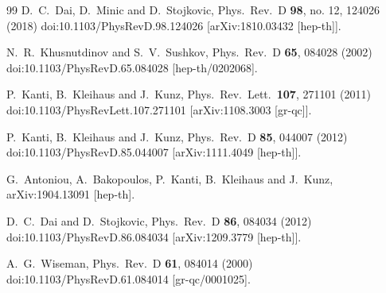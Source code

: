 \documentclass[prd, amsfonts, twocolumn, nofootinbib, showpacs]{revtex4}
\begin{document}
\begin{thebibliography}{99}
  D.~C.~Dai, D.~Minic and D.~Stojkovic,
  Phys.\ Rev.\ D {\bf 98}, no. 12, 124026 (2018)
  doi:10.1103/PhysRevD.98.124026
  [arXiv:1810.03432 [hep-th]].

  N.~R.~Khusnutdinov and S.~V.~Sushkov,
  Phys.\ Rev.\ D {\bf 65}, 084028 (2002)
  doi:10.1103/PhysRevD.65.084028
  [hep-th/0202068].

  P.~Kanti, B.~Kleihaus and J.~Kunz,
  Phys.\ Rev.\ Lett.\  {\bf 107}, 271101 (2011)
  doi:10.1103/PhysRevLett.107.271101
  [arXiv:1108.3003 [gr-qc]].

  P.~Kanti, B.~Kleihaus and J.~Kunz,
  Phys.\ Rev.\ D {\bf 85}, 044007 (2012)
  doi:10.1103/PhysRevD.85.044007
  [arXiv:1111.4049 [hep-th]].

  G.~Antoniou, A.~Bakopoulos, P.~Kanti, B.~Kleihaus and J.~Kunz,
  arXiv:1904.13091 [hep-th].

  D.~C.~Dai and D.~Stojkovic,
  Phys.\ Rev.\ D {\bf 86}, 084034 (2012)
  doi:10.1103/PhysRevD.86.084034
  [arXiv:1209.3779 [hep-th]].
  
  A.~G.~Wiseman,
  Phys.\ Rev.\ D {\bf 61}, 084014 (2000)
  doi:10.1103/PhysRevD.61.084014
  [gr-qc/0001025].


\end{thebibliography}
\end{document}
